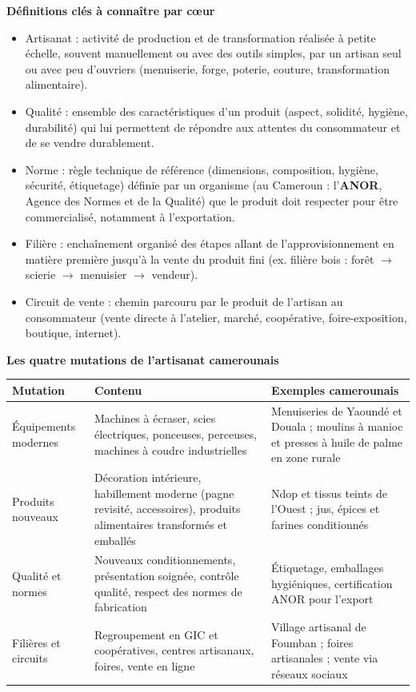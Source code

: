 \documentclass[11pt]{article}
\newcommand{\cle}[1]{{\popxbold\color{popdark}#1}}
\begin{document}
\begin{bilan}
\textbf{Définitions clés à connaître par c\oe ur}
\begin{itemize}
  \item \cle{Artisanat} : activité de production et de transformation réalisée à petite échelle, souvent manuellement ou avec des outils simples, par un artisan seul ou avec peu d'ouvriers (menuiserie, forge, poterie, couture, transformation alimentaire).
  \item \cle{Qualité} : ensemble des caractéristiques d'un produit (aspect, solidité, hygiène, durabilité) qui lui permettent de répondre aux attentes du consommateur et de se vendre durablement.
  \item \cle{Norme} : règle technique de référence (dimensions, composition, hygiène, sécurité, étiquetage) définie par un organisme (au Cameroun : l'\textbf{ANOR}, Agence des Normes et de la Qualité) que le produit doit respecter pour être commercialisé, notamment à l'exportation.
  \item \cle{Filière} : enchaînement organisé des étapes allant de l'approvisionnement en matière première jusqu'à la vente du produit fini (ex. filière bois : forêt $\rightarrow$ scierie $\rightarrow$ menuisier $\rightarrow$ vendeur).
  \item \cle{Circuit de vente} : chemin parcouru par le produit de l'artisan au consommateur (vente directe à l'atelier, marché, coopérative, foire-exposition, boutique, internet).
\end{itemize}

\textbf{Les quatre mutations de l'artisanat camerounais}
\begin{center}
\begin{tabularx}{\linewidth}{|l|X|X|}\hline
\rowcolor{popblueL} \textbf{Mutation} & \textbf{Contenu} & \textbf{Exemples camerounais} \\ \hline
Équipements modernes & Machines à écraser, scies électriques, ponceuses, perceuses, machines à coudre industrielles & Menuiseries de Yaoundé et Douala ; moulins à manioc et presses à huile de palme en zone rurale \\ \hline
Produits nouveaux & Décoration intérieure, habillement moderne (pagne revisité, accessoires), produits alimentaires transformés et emballés & Ndop et tissus teints de l'Ouest ; jus, épices et farines conditionnés \\ \hline
Qualité et normes & Nouveaux conditionnements, présentation soignée, contrôle qualité, respect des normes de fabrication & Étiquetage, emballages hygiéniques, certification ANOR pour l'export \\ \hline
Filières et circuits & Regroupement en GIC et coopératives, centres artisanaux, foires, vente en ligne & Village artisanal de Foumban ; foires artisanales ; vente via réseaux sociaux \\ \hline
\end{tabularx}
\end{center}


\end{bilan}
\end{document}
